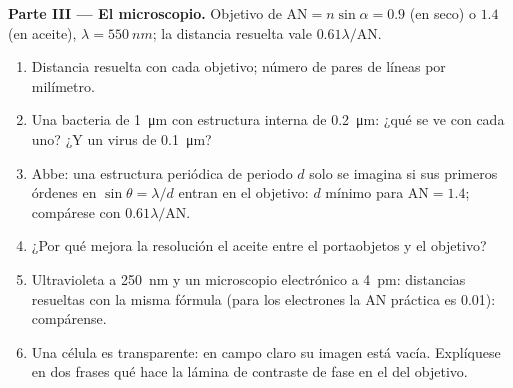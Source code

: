 \begin{problem}
\medskip
\noindent\textbf{Parte III --- El microscopio.}
Objetivo de  $\mathrm{AN} = n\sin\alpha = 0.9$ (en seco) o $1.4$
(en aceite), $\lambda = \qty{550}{nm}$; la distancia resuelta vale $0.61\lambda/\mathrm{AN}$.
\begin{enumerate}[resume]
  \item Distancia resuelta con cada objetivo; número de pares de líneas
        por milímetro.
  \item Una bacteria de \qty{1}{\micro m} con estructura interna de
        \qty{0.2}{\micro m}: ¿qué se ve con cada uno? ¿Y un virus de \qty{0.1}{\micro m}?
  \item Abbe: una estructura periódica de periodo $d$ solo se imagina si sus
        primeros órdenes en $\sin\theta = \lambda/d$ entran en el objetivo: $d$ mínimo
        para $\mathrm{AN} = 1.4$; compárese con $0.61\lambda/\mathrm{AN}$.
  \item ¿Por qué mejora la resolución el aceite entre el portaobjetos y el objetivo?
  \item Ultravioleta a \qty{250}{nm} y un microscopio electrónico a \qty{4}{pm}:
        distancias resueltas con la misma fórmula (para los electrones la
        AN práctica es \qty{0.01}{}): compárense.
  \item Una célula es transparente: en campo claro su imagen está vacía.
        Explíquese en dos frases qué hace la lámina de contraste de fase en el
         del objetivo.
\end{enumerate}


\end{problem}
